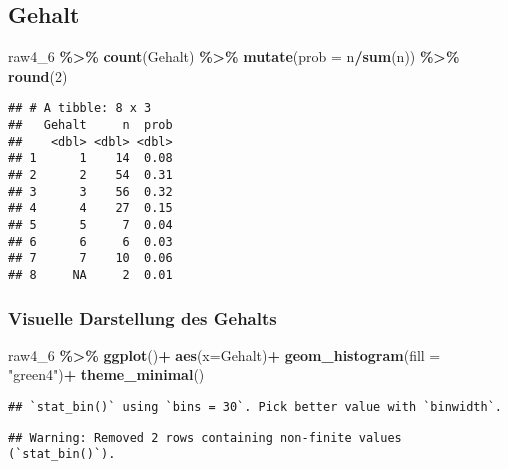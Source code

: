 \documentclass[
]{article}
\newenvironment{Shaded}{\begin{snugshade}}{\end{snugshade}}
\newcommand{\AttributeTok}[1]{\textcolor[rgb]{0.13,0.29,0.53}{#1}}
\newcommand{\DecValTok}[1]{\textcolor[rgb]{0.00,0.00,0.81}{#1}}
\newcommand{\FunctionTok}[1]{\textcolor[rgb]{0.13,0.29,0.53}{\textbf{#1}}}
\newcommand{\NormalTok}[1]{#1}
\newcommand{\SpecialCharTok}[1]{\textcolor[rgb]{0.81,0.36,0.00}{\textbf{#1}}}
\newcommand{\StringTok}[1]{\textcolor[rgb]{0.31,0.60,0.02}{#1}}
\begin{document}
\subsection{Gehalt}\label{gehalt}

\begin{Shaded}
\begin{Highlighting}[]
\NormalTok{raw4\_6 }\SpecialCharTok{\%\textgreater{}\%} 
  \FunctionTok{count}\NormalTok{(Gehalt) }\SpecialCharTok{\%\textgreater{}\%} 
  \FunctionTok{mutate}\NormalTok{(}\AttributeTok{prob =}\NormalTok{ n}\SpecialCharTok{/}\FunctionTok{sum}\NormalTok{(n)) }\SpecialCharTok{\%\textgreater{}\%} 
  \FunctionTok{round}\NormalTok{(}\DecValTok{2}\NormalTok{)}
\end{Highlighting}
\end{Shaded}

\begin{verbatim}
## # A tibble: 8 x 3
##   Gehalt     n  prob
##    <dbl> <dbl> <dbl>
## 1      1    14  0.08
## 2      2    54  0.31
## 3      3    56  0.32
## 4      4    27  0.15
## 5      5     7  0.04
## 6      6     6  0.03
## 7      7    10  0.06
## 8     NA     2  0.01
\end{verbatim}

\subsubsection{Visuelle Darstellung des
Gehalts}\label{visuelle-darstellung-des-gehalts}

\begin{Shaded}
\begin{Highlighting}[]
\NormalTok{raw4\_6 }\SpecialCharTok{\%\textgreater{}\%} 
  \FunctionTok{ggplot}\NormalTok{()}\SpecialCharTok{+}
  \FunctionTok{aes}\NormalTok{(}\AttributeTok{x=}\NormalTok{Gehalt)}\SpecialCharTok{+}
  \FunctionTok{geom\_histogram}\NormalTok{(}\AttributeTok{fill =} \StringTok{"green4"}\NormalTok{)}\SpecialCharTok{+}
  \FunctionTok{theme\_minimal}\NormalTok{()}
\end{Highlighting}
\end{Shaded}

\begin{verbatim}
## `stat_bin()` using `bins = 30`. Pick better value with `binwidth`.
\end{verbatim}

\begin{verbatim}
## Warning: Removed 2 rows containing non-finite values (`stat_bin()`).
\end{verbatim}
\end{document}
